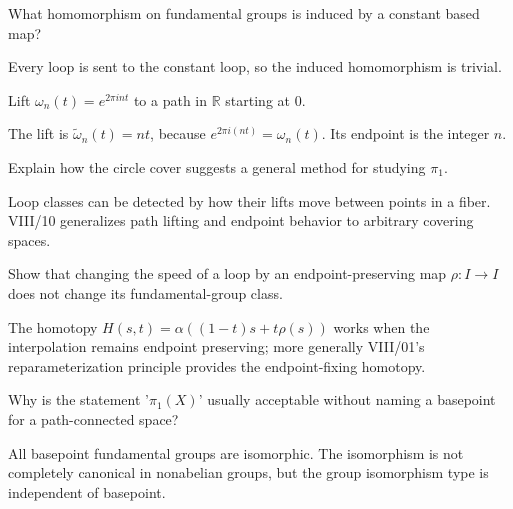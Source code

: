 \begin{problem}\label{prob:viii09-18}
What homomorphism on fundamental groups is induced by a constant based map?
\end{problem}
\begin{solution}
Every loop is sent to the constant loop, so the induced homomorphism is trivial.
\end{solution}

\begin{problem}\label{prob:viii09-19}
Lift \(\omega_n(t)=e^{2\pi int}\) to a path in \(\mathbb R\) starting at \(0\).
\end{problem}
\begin{solution}
The lift is \(\widetilde\omega_n(t)=nt\), because \(e^{2\pi i(nt)}=\omega_n(t)\).  Its endpoint is the integer \(n\).
\end{solution}

\begin{problem}\label{prob:viii09-20}
Explain how the circle cover suggests a general method for studying \(\pi_1\).
\end{problem}
\begin{solution}
Loop classes can be detected by how their lifts move between points in a fiber.  VIII/10 generalizes path lifting and endpoint behavior to arbitrary covering spaces.
\end{solution}

\begin{problem}\label{prob:viii09-21}
Show that changing the speed of a loop by an endpoint-preserving map \(\rho:I\to I\) does not change its fundamental-group class.
\end{problem}
\begin{solution}
The homotopy \(H(s,t)=\alpha((1-t)s+t\rho(s))\) works when the interpolation remains endpoint preserving; more generally VIII/01's reparameterization principle provides the endpoint-fixing homotopy.
\end{solution}

\begin{problem}\label{prob:viii09-22}
Why is the statement '\(\pi_1(X)\)' usually acceptable without naming a basepoint for a path-connected space?
\end{problem}
\begin{solution}
All basepoint fundamental groups are isomorphic.  The isomorphism is not completely canonical in nonabelian groups, but the group isomorphism type is independent of basepoint.
\end{solution}

